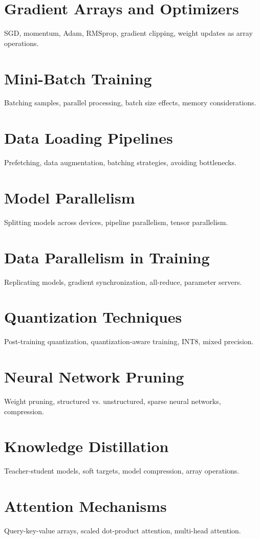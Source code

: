\chapter{Gradient Arrays and Optimizers}
SGD, momentum, Adam, RMSprop, gradient clipping, weight updates as array operations.

\chapter{Mini-Batch Training}
Batching samples, parallel processing, batch size effects, memory considerations.

\chapter{Data Loading Pipelines}
Prefetching, data augmentation, batching strategies, avoiding bottlenecks.

\chapter{Model Parallelism}
Splitting models across devices, pipeline parallelism, tensor parallelism.

\chapter{Data Parallelism in Training}
Replicating models, gradient synchronization, all-reduce, parameter servers.

\chapter{Quantization Techniques}
Post-training quantization, quantization-aware training, INT8, mixed precision.

\chapter{Neural Network Pruning}
Weight pruning, structured vs. unstructured, sparse neural networks, compression.

\chapter{Knowledge Distillation}
Teacher-student models, soft targets, model compression, array operations.

\chapter{Attention Mechanisms}
Query-key-value arrays, scaled dot-product attention, multi-head attention.

